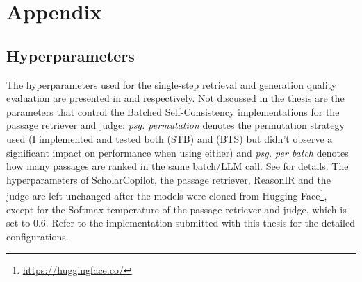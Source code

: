 \chapter{Appendix}

\section{Hyperparameters}\label{hyperparameters}
The hyperparameters used for the single-step retrieval and generation quality evaluation are presented in  and  respectively. Not discussed in the thesis are the parameters that control the Batched Self-Consistency implementations for the passage retriever and judge: \emph{psg. permutation} denotes the permutation strategy used (I implemented and tested both  (STB) and  (BTS) but didn't observe a significant impact on performance when using either) and \emph{psg. per batch} denotes how many passages are ranked in the same batch/LLM call. See \cite[3.2.2]{korikov2025batched} for details. The hyperparameters of ScholarCopilot, the passage retriever, ReasonIR and the judge are left unchanged after the models were cloned from Hugging Face\footnote{\url{https://huggingface.co/}}, except for the Softmax temperature of the passage retriever and judge, which is set to $0.6$. Refer to the implementation submitted with this thesis for the detailed configurations. 

